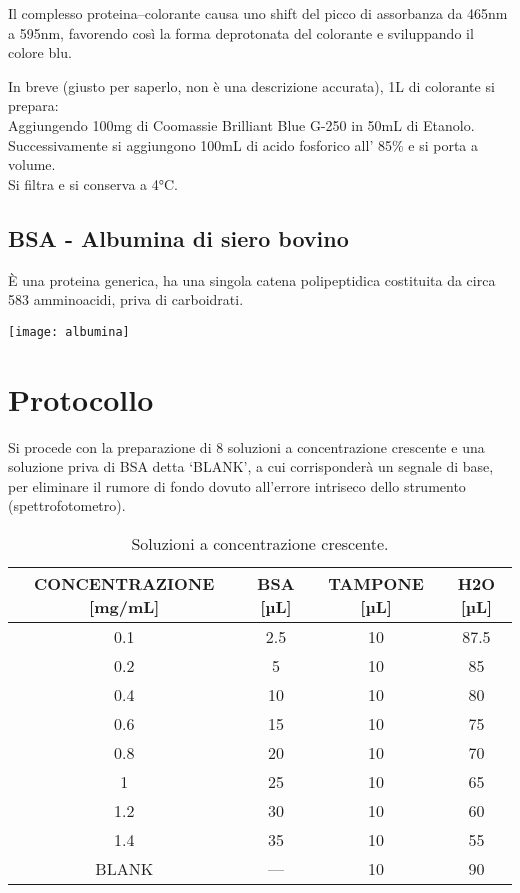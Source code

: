 \documentclass[12pt, a4paper]{article}
\begin{document}
Il complesso proteina--colorante causa uno shift del picco di assorbanza da 465nm a 595nm, favorendo così la forma deprotonata del colorante e sviluppando il colore blu.



In breve (giusto per saperlo, non è una descrizione accurata), 1L di colorante si prepara: \\
Aggiungendo 100mg di Coomassie Brilliant Blue G-250 in 50mL di Etanolo. \\
Successivamente si aggiungono 100mL di acido fosforico all' 85\% e si porta a volume. \\
Si filtra e si conserva a 4°C.

\subsection*{BSA - Albumina di siero bovino}
\`E una proteina generica, ha una singola catena polipeptidica costituita da circa 583 amminoacidi, priva di carboidrati.

\begin{center}
\texttt{[image: albumina]}
\begin{figure}[!h]
\cite{pianeta-chimica}
\end{figure}
\end{center}

\section{Protocollo}
Si procede con la preparazione di 8 soluzioni a concentrazione crescente e una soluzione priva di BSA detta `BLANK', a cui corrisponderà un segnale di base, per eliminare il rumore di fondo dovuto all'errore intriseco dello strumento (spettrofotometro).

\begin{table}[!h]
\begin{tabular}{c|c|c|c}
CONCENTRAZIONE [mg/mL] & BSA [µL] & TAMPONE [µL] & H2O [µL] \\
\hline
0.1 & 2.5 & 10 & 87.5 \\
0.2 & 5 & 10 & 85 \\
0.4 & 10 & 10 & 80 \\
0.6 & 15 & 10 & 75 \\
0.8 & 20 & 10 & 70 \\
1 & 25 & 10 & 65 \\
1.2 & 30 & 10 & 60 \\
1.4 & 35 & 10 & 55 \\
BLANK & --- & 10 & 90 \\
\end{tabular}
\caption{Soluzioni a concentrazione crescente.}
\end{table}
\end{document}
